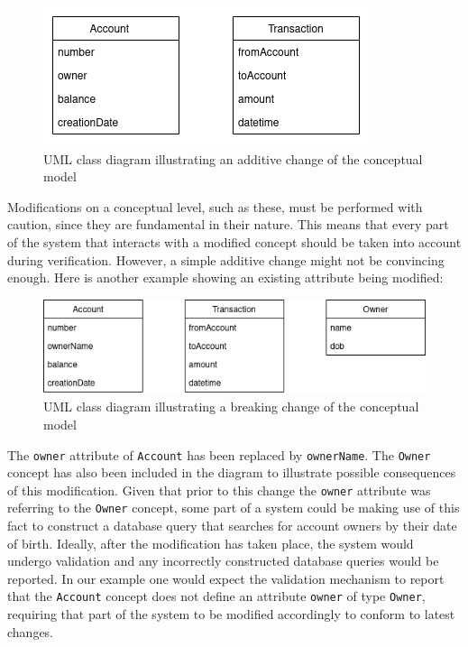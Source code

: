 \begin{figure}[H]\centering
    \includegraphics[scale=0.65]{images/banking1.drawio.png}
    \caption{UML class diagram illustrating an additive change of the conceptual model}\label{fig:bank1}
\end{figure}

\n

Modifications on a conceptual level, such as these, must be performed with caution, since they are fundamental in their nature. This means that every part of the system that interacts with a modified concept should be taken into account during verification. However, a simple additive change might not be convincing enough. Here is another example showing an existing attribute being modified:

\begin{figure}[H]\centering
    \includegraphics[scale=0.65]{images/banking2.drawio.png}
    \caption{UML class diagram illustrating a breaking change of the conceptual model}\label{fig:bank2}
\end{figure}

The \texttt{owner} attribute of \texttt{Account} has been replaced by \texttt{ownerName}. The \texttt{Owner} concept has also been included in the diagram to illustrate possible consequences of this modification. Given that prior to this change the \texttt{owner} attribute was referring to the \texttt{Owner} concept, some part of a system could be making use of this fact to construct a database query that searches for account owners by their date of birth. Ideally, after the modification has taken place, the system would undergo validation and any incorrectly constructed database queries would be reported. In our example one would expect the validation mechanism to report that the \texttt{Account} concept does not define an attribute \texttt{owner} of type \texttt{Owner}, requiring that part of the system to be modified accordingly to conform to latest changes.

